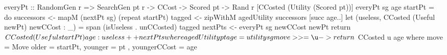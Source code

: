 everyPt :: RandomGen r
        => SearchGen pt r -> CCost -> Scored pt
        -> Rand r [CCosted (Utility (Scored pt))]
everyPt sg age startPt = do
  successors <- mapM (nextPt sg) (repeat startPt)
  tagged <- zipWithM agedUtility successors [succ age..]
  let (useless, CCosted (Useful newPt) newCCost : _) =
                        span (isUseless . unCCosted) tagged
  nextPts <- everyPt sg newCCost newPt
  return $ CCosted (Useful startPt) age : useless ++ nextPts

  where agedUtility pt age =
           utility sg move >>= \u -> return $ CCosted u age
         where move = Move { older = startPt, younger = pt
                           , youngerCCost = age }
